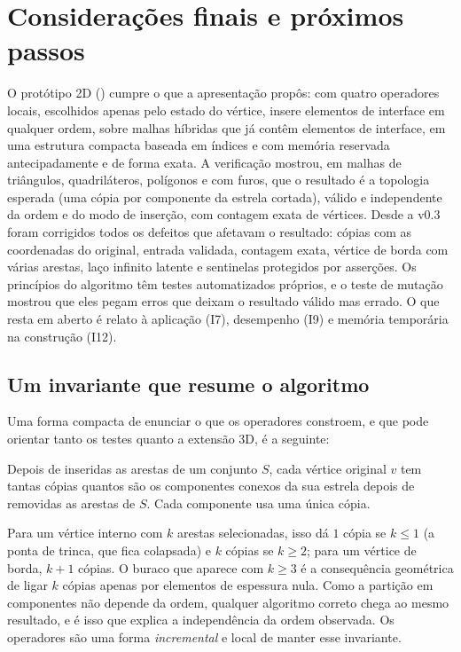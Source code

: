 \section{Considerações finais e próximos passos}
\label{sec:conclusao}

O protótipo 2D () cumpre o que a apresentação propôs: com quatro operadores locais,
escolhidos apenas pelo estado do vértice, insere elementos de interface em qualquer ordem, sobre malhas híbridas que já
contêm elementos de interface, em uma estrutura compacta baseada em índices e com memória reservada antecipadamente e de
forma exata. A verificação mostrou, em malhas de triângulos, quadriláteros, polígonos e com furos, que o resultado é a
topologia esperada (uma cópia por componente da estrela cortada), válido e independente da ordem e do modo de
inserção, com contagem exata de vértices. Desde a v0.3 foram corrigidos todos os defeitos que afetavam o resultado:
cópias com as coordenadas do original, entrada validada, contagem exata, vértice de borda com várias arestas, laço
infinito latente e sentinelas protegidos por asserções. Os princípios do algoritmo têm testes automatizados próprios, e
o teste de mutação mostrou que eles pegam erros que deixam o resultado válido mas errado. O que resta em aberto é relato
à aplicação (I7), desempenho (I9) e memória temporária na construção (I12).

\subsection{Um invariante que resume o algoritmo}

Uma forma compacta de enunciar o que os operadores constroem, e que pode orientar tanto os testes quanto a extensão 3D,
é a seguinte:

\begin{nota}[Invariante]
Depois de inseridas as arestas de um conjunto $S$, cada vértice original $v$ tem tantas cópias quantos são os
componentes conexos da sua estrela depois de removidas as arestas de $S$. Cada componente usa uma única cópia.
\end{nota}

Para um vértice interno com $k$ arestas selecionadas, isso dá $1$ cópia se $k\le1$ (a ponta de trinca, que fica
colapsada) e $k$ cópias se $k\ge2$; para um vértice de borda, $k+1$ cópias. O buraco que aparece com $k\ge3$ é a
consequência geométrica de ligar $k$ cópias apenas por elementos de espessura nula. Como a partição em componentes não
depende da ordem, qualquer algoritmo correto chega ao mesmo resultado, e é isso que explica a independência da ordem
observada. Os operadores são uma forma \emph{incremental} e local de manter esse invariante.

